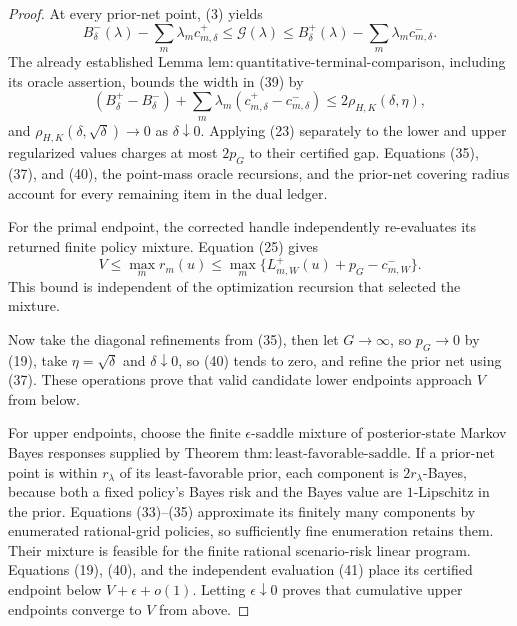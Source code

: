 \documentclass{article}
\begin{document}
\begin{proof}
At every prior-net point, (3) yields
\[
 B_\delta^-(\lambda)-\sum_m\lambda_mc_{m,\delta}^+
 \leq\mathcal G(\lambda)\leq
 B_\delta^+(\lambda)-\sum_m\lambda_mc_{m,\delta}^-.
 \tag{39}
\]
The already established Lemma \(\mathrm{lem{:}quantitative\text{-}terminal\text{-}comparison}\), including its oracle assertion, bounds the width in (39) by
\[
 (B_\delta^+-B_\delta^-)+
 \sum_m\lambda_m(c_{m,\delta}^+-c_{m,\delta}^-)
 \leq2\rho_{H,K}(\delta,\eta),
 \tag{40}
\]
and \(\rho_{H,K}(\delta,\sqrt\delta)\to0\) as \(\delta\downarrow0\).  Applying (23) separately to the lower and upper regularized values charges at most \(2p_G\) to their certified gap.  Equations (35), (37), and (40), the point-mass oracle recursions, and the prior-net covering radius account for every remaining item in the dual ledger.

For the primal endpoint, the corrected handle independently re-evaluates its returned finite policy mixture.  Equation (25) gives
\[
 V\leq\max_m r_m(u)\leq
 \max_m\{L_{m,W}^+(u)+p_G-c_{m,W}^-\}.
 \tag{41}
\]
This bound is independent of the optimization recursion that selected the mixture.

Now take the diagonal refinements from (35), then let \(G\to\infty\), so \(p_G\to0\) by (19), take \(\eta=\sqrt\delta\) and \(\delta\downarrow0\), so (40) tends to zero, and refine the prior net using (37).  These operations prove that valid candidate lower endpoints approach \(V\) from below.

For upper endpoints, choose the finite \(\epsilon\)-saddle mixture of posterior-state Markov Bayes responses supplied by Theorem \(\mathrm{thm{:}least\text{-}favorable\text{-}saddle}\).  If a prior-net point is within \(r_\lambda\) of its least-favorable prior, each component is \(2r_\lambda\)-Bayes, because both a fixed policy's Bayes risk and the Bayes value are \(1\)-Lipschitz in the prior.  Equations (33)--(35) approximate its finitely many components by enumerated rational-grid policies, so sufficiently fine enumeration retains them.  Their mixture is feasible for the finite rational scenario-risk linear program.  Equations (19), (40), and the independent evaluation (41) place its certified endpoint below \(V+\epsilon+o(1)\).  Letting \(\epsilon\downarrow0\) proves that cumulative upper endpoints converge to \(V\) from above.


\end{proof}
\end{document}
